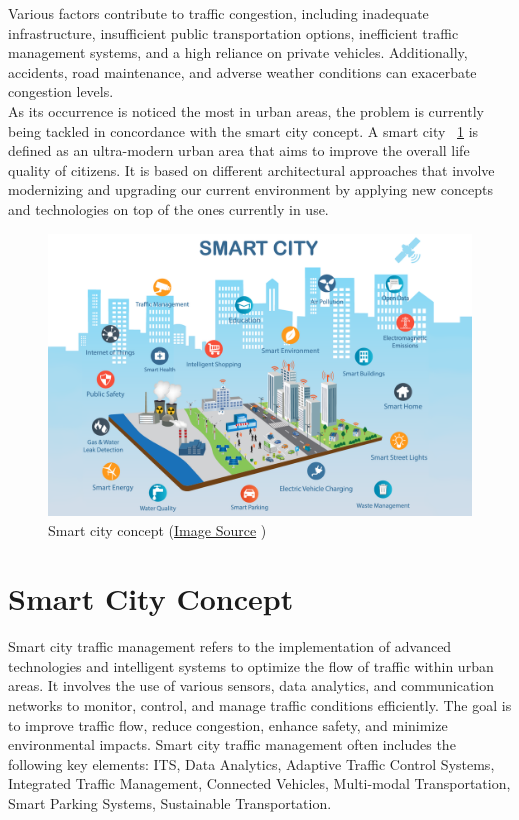 \documentclass[17pt]{report}
\begin{document}
Various factors contribute to traffic congestion, including
inadequate infrastructure, insufficient public transportation options,
inefficient traffic management systems, and a high reliance on private
vehicles. Additionally, accidents, road maintenance, and adverse
weather conditions can exacerbate congestion levels. \\
\indent \indent
As its occurrence is noticed the most in urban areas,
the problem is currently being tackled in concordance 
with the smart city concept. A smart city ~\ref{fig:SmartCity} is defined as an 
ultra-modern urban area that aims to improve the overall life
quality of citizens. It is based on different architectural
approaches that involve modernizing and upgrading our current 
environment by applying new concepts and technologies on top
of the ones currently in use.

\begin{figure}[h!]
    \includegraphics[width=\textwidth]{SmartCity.png}
    \caption{Smart city concept 
    (\href{https://aliga.sk/en/what-the-heck-is-a-smart-city/}{Image Source} \textcopyright)}
    \label{fig:SmartCity}
\end{figure}

\section{Smart City Concept}
\indent \indent
Smart city traffic management refers to the implementation of advanced
technologies and intelligent systems to optimize the flow of traffic within
urban areas. It involves the use of various sensors, data analytics,
and communication networks to monitor, control, and manage traffic conditions
efficiently. The goal is to improve traffic flow, reduce congestion, enhance safety,
and minimize environmental impacts. Smart city traffic management often includes
the following key elements: ITS, Data Analytics, Adaptive Traffic Control Systems,
Integrated Traffic Management, Connected Vehicles, Multi-modal Transportation,
Smart Parking Systems, Sustainable Transportation.\\
\end{document}

